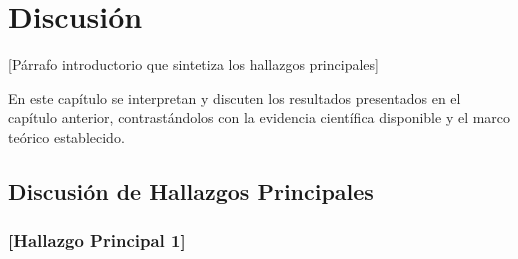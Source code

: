
\chapter{Discusión}
\label{cap:discusion}

\justifying
\setlength{\parskip}{0pt}


{[Párrafo introductorio que sintetiza los hallazgos principales]}

En este capítulo se interpretan y discuten los resultados presentados en el capítulo anterior, contrastándolos con la evidencia científica disponible y el marco teórico establecido.


\section{Discusión de Hallazgos Principales}
\label{sec:discusion_hallazgos}

\subsection{{[Hallazgo Principal 1]}}
\label{subsec:discusion_hallazgo1}


